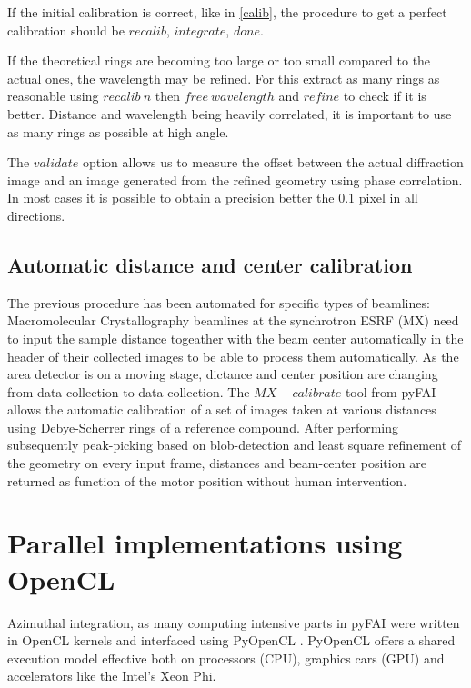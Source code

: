 \documentclass[preprint]{iucr}
\begin{document}
If the initial calibration is correct, like in \ref{calib}, the procedure
to get a perfect calibration should be $recalib$, $integrate$, $done$.

If the theoretical rings are becoming too large or too small compared to the
actual ones, the wavelength may be refined. For this extract as many rings as
reasonable using $recalib\ n$ then $free\ wavelength$ and $refine$ to check if
it is better. Distance and wavelength being heavily correlated, it is important
to use as many rings as possible at high angle.

The $validate$ option allows us to measure the offset between the actual
diffraction image and an image generated from the refined geometry using phase
correlation. In most cases it is possible to obtain a precision better the 0.1
pixel in all directions.

\subsection{Automatic distance and center calibration}
The previous procedure has been automated for specific types of beamlines: 
Macromolecular Crystallography beamlines at the synchrotron ESRF (MX) need to
input the sample distance togeather with the beam center automatically in the header of
their collected images to be able to process them automatically.
As the area detector is on a moving stage, dictance and center position are
changing from data-collection to data-collection.
The $MX-calibrate$ tool from pyFAI allows the automatic calibration of
a set of images taken at various distances using Debye-Scherrer rings of a
reference compound.
After performing subsequently peak-picking based on blob-detection and least
square refinement of the geometry on every input frame, distances and
beam-center position are returned as function of the motor position without
human intervention.

\section{Parallel implementations using OpenCL}
Azimuthal integration, as  many computing intensive parts in pyFAI were written
in OpenCL kernels and interfaced using PyOpenCL \cite{pyopencl}. PyOpenCL offers a
shared execution model effective both on processors (CPU), graphics cars (GPU)
and accelerators like the Intel's Xeon Phi.
\end{document}
